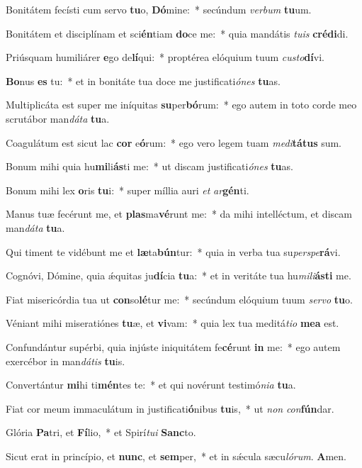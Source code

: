 ﻿\item Bonitátem fecísti cum servo \textbf{tu}o, \textbf{Dó}mine:~* secúndum \emph{ver}\emph{bum} \textbf{tu}um.
\item Bonitátem et disciplínam et sci\textbf{én}tiam \textbf{do}ce me:~* quia mandátis \emph{tu}\emph{is} \textbf{cré}\textbf{di}di.
\item Priúsquam humiliárer \textbf{e}go de\textbf{lí}qui:~* proptérea elóquium tuum \emph{cus}\emph{to}\textbf{dí}vi.
\item \textbf{Bo}nus \textbf{es} tu:~* et in bonitáte tua doce me justificati\emph{ó}\emph{nes} \textbf{tu}as.
\item Multiplicáta est super me iníquitas \textbf{su}per\textbf{bó}rum:~* ego autem in toto corde meo scrutábor man\emph{dá}\emph{ta} \textbf{tu}a.
\item Coagulátum est sicut lac \textbf{cor} e\textbf{ó}rum:~* ego vero legem tuam \emph{me}\emph{di}\textbf{tá}\textbf{tus} sum.
\item Bonum mihi quia hu\textbf{mi}li\textbf{ás}ti me:~* ut discam justificati\emph{ó}\emph{nes} \textbf{tu}as.
\item Bonum mihi lex \textbf{o}ris \textbf{tu}i:~* super míllia auri \emph{et} \emph{ar}\textbf{gén}ti.
\item Manus tuæ fecérunt me, et \textbf{plas}ma\textbf{vé}runt me:~* da mihi intelléctum, et discam man\emph{dá}\emph{ta} \textbf{tu}a.
\item Qui timent te vidébunt me et \textbf{læ}ta\textbf{bún}tur:~* quia in verba tua su\emph{per}\emph{spe}\textbf{rá}vi.
\item Cognóvi, Dómine, quia ǽquitas ju\textbf{dí}cia \textbf{tu}a:~* et in veritáte tua hu\emph{mi}\emph{li}\textbf{ás}\textbf{ti} me.
\item Fiat misericórdia tua ut \textbf{con}so\textbf{lé}tur me:~* secúndum elóquium tuum \emph{ser}\emph{vo} \textbf{tu}o.
\item Véniant mihi miseratiónes \textbf{tu}æ, et \textbf{vi}vam:~* quia lex tua meditá\emph{ti}\emph{o} \textbf{me}\textbf{a} est.
\item Confundántur supérbi, quia injúste iniquitátem fe\textbf{cé}runt \textbf{in} me:~* ego autem exercébor in man\emph{dá}\emph{tis} \textbf{tu}is.
\item Convertántur \textbf{mi}hi ti\textbf{mén}tes te:~* et qui novérunt testimó\emph{ni}\emph{a} \textbf{tu}a.
\item Fiat cor meum immaculátum in justificati\textbf{ó}nibus \textbf{tu}is,~* ut \emph{non} \emph{con}\textbf{fún}dar.
\item Glória \textbf{Pa}tri, et \textbf{Fí}lio,~* et Spirí\emph{tu}\emph{i} \textbf{Sanc}to.
\item Sicut erat in princípio, et \textbf{nunc}, et \textbf{sem}per,~* et in sǽcula sæcu\emph{ló}\emph{rum}. \textbf{A}men.